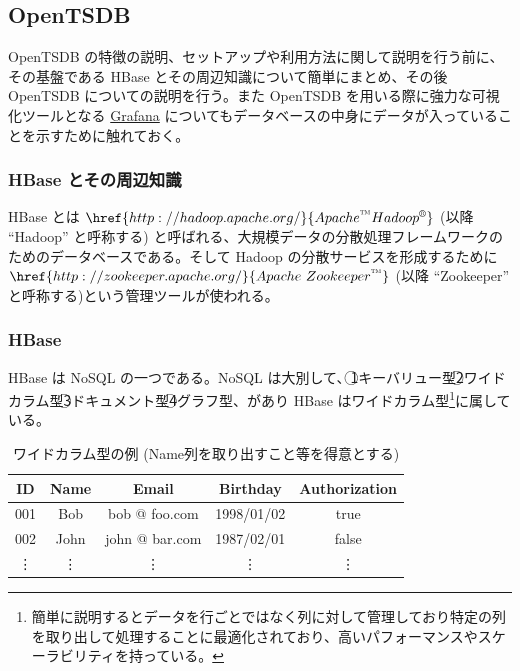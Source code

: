 \documentclass{scrartcl}
\begin{document}
\newpage
\subsection{OpenTSDB}
\label{sec:org425ee64}
OpenTSDB の特徴の説明、セットアップや利用方法に関して説明を行う前に、その基盤である HBase とその周辺知識について簡単にまとめ、その後 OpenTSDB についての説明を行う。また OpenTSDB を用いる際に強力な可視化ツールとなる \href{https://grafana.com/}{Grafana} についてもデータベースの中身にデータが入っていることを示すために触れておく。\\

\subsubsection{HBase とその周辺知識}
\label{sec:org3279f1e}
HBase とは \(\href{http://hadoop.apache.org/}{Apache \textsuperscript{\texttrademark} Hadoop \textsuperscript{\textregistered}}\) (以降 ``Hadoop'' と呼称する) と呼ばれる、大規模データの分散処理フレームワークのためのデータベースである。そして Hadoop の分散サービスを形成するために \(\href{http://zookeeper.apache.org/}{Apache \ Zookeeper \textsuperscript{\texttrademark}}\) (以降 ``Zookeeper'' と呼称する)という管理ツールが使われる。\\
\subsubsection{HBase}
\label{sec:orgb778e7a}
HBase は NoSQL の一つである。NoSQL は大別して、\textcircled{\scriptsize 1}キーバリュー型\textcircled{\scriptsize 2}ワイドカラム型\textcircled{\scriptsize 3}ドキュメント型\textcircled{\scriptsize 4}グラフ型、があり HBase はワイドカラム型\footnote{簡単に説明するとデータを行ごとではなく列に対して管理しており特定の列を取り出して処理することに最適化されており、高いパフォーマンスやスケーラビリティを持っている。}に属している。\\

\begin{table}[htbp]
\caption{ワイドカラム型の例 (Name列を取り出すこと等を得意とする)}
\centering
\begin{tabular}{|c|c|c|c|c|}
\hline
ID & Name & Email & Birthday & Authorization\\
\hline
001 & Bob & bob @ foo.com & 1998/01/02 & true\\
002 & John & john @ bar.com & 1987/02/01 & false\\
\vdots & \vdots & \vdots & \vdots & \vdots\\
\hline
\end{tabular}
\end{table}
\end{document}
